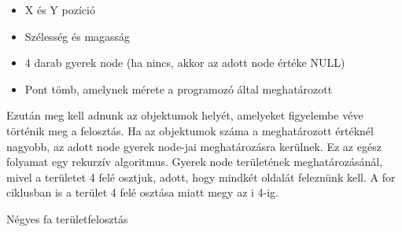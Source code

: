 \begin{itemize}
\item X és Y pozíció
\item Szélesség és magasság
\item 4 darab gyerek node (ha nincs, akkor az adott node értéke NULL)
\item Pont tömb, amelynek mérete a programozó által meghatározott
\end{itemize}

Ezután meg kell adnunk az objektumok helyét, amelyeket figyelembe véve történik meg a felosztás. Ha az objektumok száma a meghatározott értéknél nagyobb, az adott node gyerek node-jai meghatározásra kerülnek. Ez az egész folyamat egy rekurzív algoritmus. Gyerek node területének meghatározásánál, mivel a területet 4 felé osztjuk, adott, hogy mindkét oldalát feleznünk kell. A for ciklusban is a terület 4 felé osztása miatt megy az i 4-ig. 

\begin{algorithm}[H]
 \caption{Négyes fa területfelosztás}
\end{algorithm}

